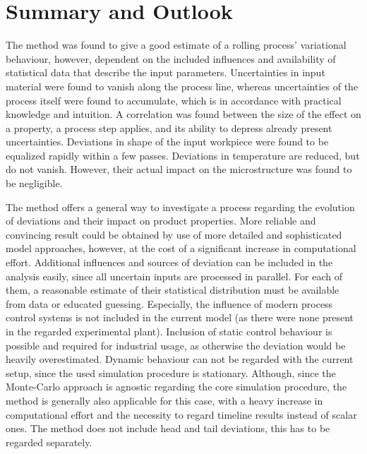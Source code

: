 \documentclass[DIV=13]{scrartcl}
\begin{document}
    


    \section{Summary and Outlook}\label{sec:summary}

    The method was found to give a good estimate of a rolling process' variational behaviour, however, dependent on the included influences and availability of statistical data that describe the input parameters.
    Uncertainties in input material were found to vanish along the process line, whereas uncertainties of the process itself were found to accumulate, which is in accordance with practical knowledge and intuition.
    A correlation was found between the size of the effect on a property, a process step applies, and its ability to depress already present uncertainties.
    Deviations in shape of the input workpiece were found to be equalized rapidly within a few passes.
    Deviations in temperature are reduced, but do not vanish.
    However, their actual impact on the microstructure was found to be negligible.

    The method offers a general way to investigate a process regarding the evolution of deviations and their impact on product properties.
    More reliable and convincing result could be obtained by use of more detailed and sophisticated model approaches, however, at the cost of a significant increase in computational effort.
    Additional influences and sources of deviation can be included in the analysis easily, since all uncertain inputs are processed in parallel.
    For each of them, a reasonable estimate of their statistical distribution must be available from data or educated guessing.
    Especially, the influence of modern process control systems is not included in the current model (as there were none present in the regarded experimental plant).
    Inclusion of static control behaviour is possible and required for industrial usage, as otherwise the deviation would be heavily overestimated.
    Dynamic behaviour can not be regarded with the current setup, since the used simulation procedure is stationary.
    Although, since the Monte-Carlo approach is agnostic regarding the core simulation procedure, the method is generally also applicable for this case, with a heavy increase in computational effort and the necessity to regard timeline results instead of scalar ones.
    The method does not include head and tail deviations, this has to be regarded separately.

    

    \printbibliography
\end{document}
